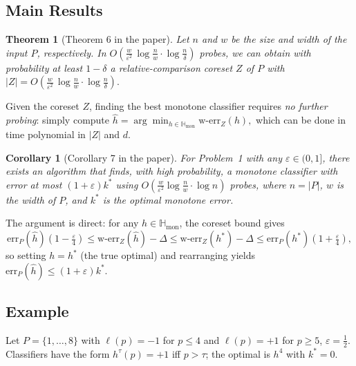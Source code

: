 \documentclass[11pt, a4paper]{article}
\theoremstyle{boxed}
\newtheorem{innertheorem}{Theorem}[section]
\newtheorem{innercorollary}{Corollary}[section]
\newenvironment{theorem}
  {\begin{mdframed}[style=thmstyle]\begin{innertheorem}}
  {\end{innertheorem}\end{mdframed}}
\newenvironment{corollary}
  {\begin{mdframed}[style=thmstyle]\begin{innercorollary}}
  {\end{innercorollary}\end{mdframed}}
\newcommand{\Hmon}{\mathbb{H}_{\mathrm{mon}}}
\newcommand{\kstar}{k^{*}}
\begin{document}
\subsection{Main Results}

\begin{theorem}[Theorem 6 in the paper]\label{thm:coreset}
  Let $n$ and $w$ be the size and width of the input $P$, respectively. In
  $ O\!\left(\frac{w}{\varepsilon^2}\,\log\!\frac{n}{w}\cdot\log\frac{n}{\delta}\right)
  $
  probes, we can obtain with probability at least $1 - \delta$ a relative-comparison coreset $Z$ of $P$ with
  $
    |Z| = O\!\left(\frac{w}{\varepsilon^2}\,\log\!\frac{n}{w}\cdot\log\frac{n}{\delta}\right).
  $
\end{theorem}

Given the coreset $Z$, finding the best monotone classifier requires \emph{no further probing}: simply compute
$ \hat{h} = \arg\min_{h\in\Hmon}\mathrm{w\text{-}err}_Z(h),$ which can be done in time polynomial in $|Z|$ and $d$.

\begin{corollary}[Corollary 7 in the paper]\label{cor:main}
  For Problem~1 with any $\varepsilon\in(0,1]$, there exists an algorithm that finds, with high probability, a monotone classifier with error at most $(1+\varepsilon)\kstar$ using
  $ O\!\left(\frac{w}{\varepsilon^2}\log\!\frac{n}{w}\cdot\log n\right)$
  probes, where $n=|P|$, $w$ is the width of $P$, and $\kstar$ is the optimal monotone error.
\end{corollary}

The argument is direct: for any $h\in\Hmon$, the coreset bound gives
\[
  \mathrm{err}_P(\hat{h})\!\left(1-\tfrac\varepsilon4\right)
  \le \mathrm{w\text{-}err}_Z(\hat{h})-\Delta
  \le \mathrm{w\text{-}err}_Z(h^*)-\Delta
  \le \mathrm{err}_P(h^*)\!\left(1+\tfrac\varepsilon4\right),
\]
so setting $h=h^*$ (the true optimal) and rearranging yields $\mathrm{err}_P(\hat{h})\le(1+\varepsilon)\kstar$.

\subsection{Example}\label{sec:rcc-example}

Let $P = \{1,\ldots,8\}$ with $\ell(p)=-1$ for $p\le 4$ and $\ell(p)=+1$ for $p\ge 5$,
$\varepsilon=\tfrac{1}{2}$. Classifiers have the form $h^\tau(p)=+1$ iff $p>\tau$;
the optimal is $h^4$ with $\kstar=0$.
\end{document}
